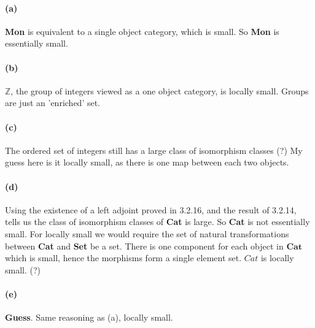 \documentclass{article}
\begin{document}
\paragraph{(a)}
\textbf{Mon} is equivalent to a single object category, which is small. So \textbf{Mon} is essentially small.
\paragraph{(b)}
$\mathds{Z}$, the group of integers viewed as a one object category, is locally small. Groups are just an 'enriched' set.
\paragraph{(c)}
The ordered set of integers still has a large class of isomorphism classes (?) My guess here is it locally small, as there is one map between each two objects.
\paragraph{(d)} Using the existence of a left adjoint proved in 3.2.16, and the result of 3.2.14, tells us the class of isomorphism classes of \textbf{Cat} is large. So \textbf{Cat} is not essentially small. For locally small we would require the set of natural transformations between \textbf{Cat} and \textbf{Set} be a set. There is one component for each object in $\textbf{Cat}$ which is small, hence the morphisms form a single element set. $Cat$ is locally small. (?)
\paragraph{(e)} \textbf{Guess}. Same reasoning as (a), locally small.
\end{document}
